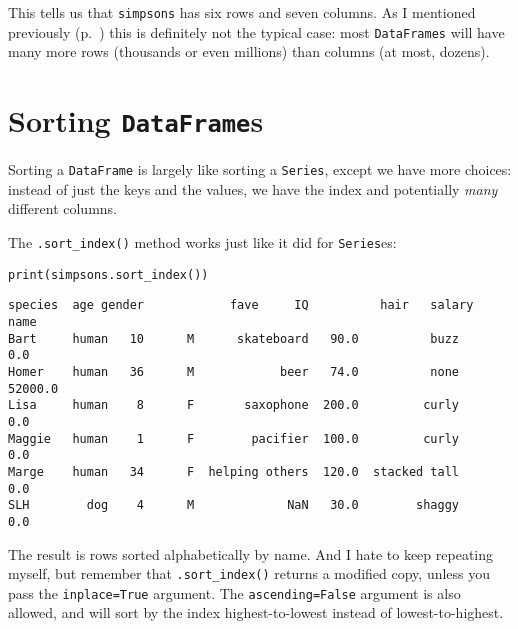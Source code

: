 This tells us that \texttt{simpsons} has six rows and seven columns. As I
mentioned previously (p.~\pageref{tallAndSkinny}) this is definitely not the
typical case: most \texttt{DataFrames} will have many more rows (thousands or
even millions) than columns (at most, dozens).

\section{Sorting \texttt{DataFrame}s}

Sorting a \texttt{DataFrame} is largely like sorting a \texttt{Series}, except
we have more choices: instead of just the keys and the values, we have the
index and potentially \textit{many} different columns.

The \texttt{.sort\_index()} method works just like it did for
\texttt{Series}es:

\begin{samepage}
\begin{Verbatim}[fontsize=\small,samepage=true,frame=single,framesep=3mm]
print(simpsons.sort_index())
\end{Verbatim}
\vspace{-.2in}

\begin{Verbatim}[fontsize=\small,samepage=true,frame=leftline,framesep=5mm,framerule=1mm]
       species  age gender            fave     IQ          hair   salary
name                                                                    
Bart     human   10      M      skateboard   90.0          buzz      0.0
Homer    human   36      M            beer   74.0          none  52000.0
Lisa     human    8      F       saxophone  200.0         curly      0.0
Maggie   human    1      F        pacifier  100.0         curly      0.0
Marge    human   34      F  helping others  120.0  stacked tall      0.0
SLH        dog    4      M             NaN   30.0        shaggy      0.0
\end{Verbatim}
\end{samepage}

The result is rows sorted alphabetically by name. And I hate to keep repeating
myself, but remember that \texttt{.sort\_index()} returns a modified copy,
unless you pass the \texttt{inplace=True} argument. The
\texttt{ascending=False} argument is also allowed, and will sort by the index
highest-to-lowest instead of lowest-to-highest.

